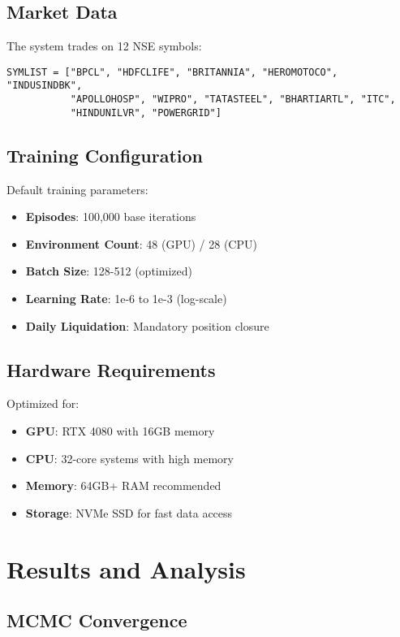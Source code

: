 \documentclass[11pt,a4paper]{article}
\begin{document}
\subsection{Market Data}

The system trades on 12 NSE symbols:
\begin{lstlisting}
SYMLIST = ["BPCL", "HDFCLIFE", "BRITANNIA", "HEROMOTOCO", "INDUSINDBK", 
           "APOLLOHOSP", "WIPRO", "TATASTEEL", "BHARTIARTL", "ITC", 
           "HINDUNILVR", "POWERGRID"]
\end{lstlisting}

\subsection{Training Configuration}

Default training parameters:
\begin{itemize}
    \item \textbf{Episodes}: 100,000 base iterations
    \item \textbf{Environment Count}: 48 (GPU) / 28 (CPU)
    \item \textbf{Batch Size}: 128-512 (optimized)
    \item \textbf{Learning Rate}: 1e-6 to 1e-3 (log-scale)
    \item \textbf{Daily Liquidation}: Mandatory position closure
\end{itemize}

\subsection{Hardware Requirements}

Optimized for:
\begin{itemize}
    \item \textbf{GPU}: RTX 4080 with 16GB memory
    \item \textbf{CPU}: 32-core systems with high memory
    \item \textbf{Memory}: 64GB+ RAM recommended
    \item \textbf{Storage}: NVMe SSD for fast data access
\end{itemize}

\section{Results and Analysis}

\subsection{MCMC Convergence}
\end{document}
